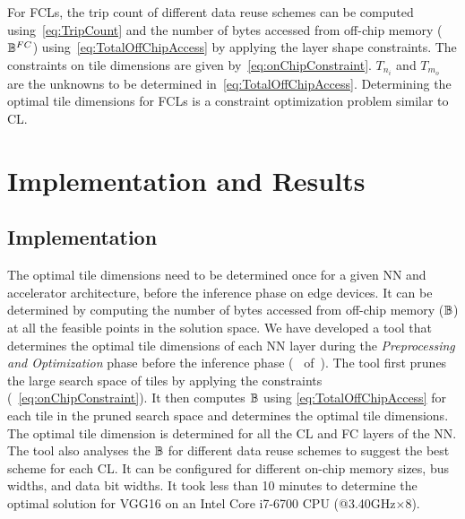 For FCLs, the trip count of different data reuse schemes can be computed using~\eqref{eq:TripCount} and the number of bytes accessed from off-chip memory ($\mathbb{B}^{FC}$) using~\eqref{eq:TotalOffChipAccess} by applying the layer shape constraints. The constraints on tile dimensions are given by~\eqref{eq:onChipConstraint}. $T_{n_i}$ and $T_{m_o}$ are the unknowns to be determined in~\eqref{eq:TotalOffChipAccess}. Determining the optimal tile dimensions for FCLs is a constraint optimization problem similar to CL.
\section{Implementation and Results}
\subsection{Implementation}
The optimal tile dimensions need to be determined once for a given NN and accelerator architecture, before the inference phase on edge devices. It can be determined by computing the number of bytes accessed from off-chip memory ($\mathbb{B}$) at all the feasible points in the solution space. 
We have developed a tool that determines the optimal tile dimensions of each NN layer during the \emph{Preprocessing and Optimization} phase before the inference phase (~ of~). The tool first prunes the large search space of tiles by applying the constraints (~\eqref{eq:onChipConstraint}). It then computes $\mathbb{B}$ using \eqref{eq:TotalOffChipAccess} for each tile in the pruned search space and determines the optimal tile dimensions. The optimal tile dimension is determined for all the CL and FC layers of the NN. The tool also analyses the $\mathbb{B}$ for different data reuse schemes to suggest the best scheme for each CL. It can be configured for different on-chip memory sizes, bus widths, and data bit widths. It took less than 10 minutes to determine the optimal solution for VGG16 on an Intel Core i7-6700 CPU (@3.40GHz$\times$8).
